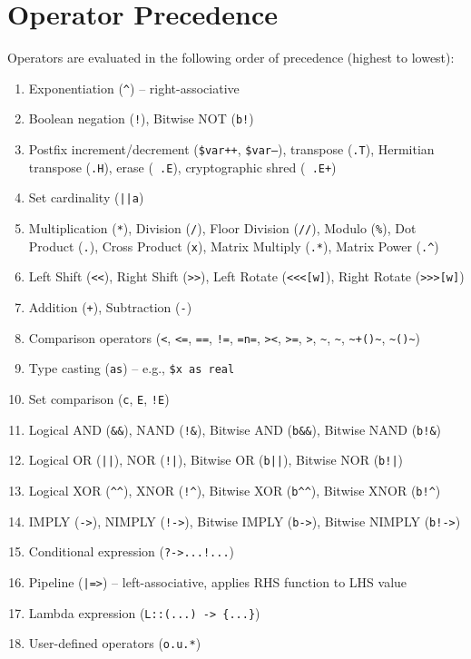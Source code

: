 \section{Operator Precedence}
Operators are evaluated in the following order of precedence (highest to lowest):
\begin{enumerate}
\item Exponentiation (\texttt{\^{}}) -- right-associative
\item Boolean negation (\texttt{!}), Bitwise NOT (\texttt{b!})
\item Postfix increment/decrement (\texttt{\$var++}, \texttt{\$var--}), transpose (\texttt{.T}), Hermitian transpose (\texttt{.H}), erase (\texttt{~.E}), cryptographic shred (\texttt{~.E+})
\item Set cardinality (\texttt{||a})
\item Multiplication (\texttt{*}), Division (\texttt{/}), Floor Division (\texttt{//}), Modulo (\texttt{\%}), Dot Product (\texttt{.}), Cross Product (\texttt{x}), Matrix Multiply (\texttt{.*}), Matrix Power (\texttt{.\^{}})
\item Left Shift (\texttt{<<}), Right Shift (\texttt{>>}), Left Rotate (\texttt{<<<[w]}), Right Rotate (\texttt{>>>[w]})
\item Addition (\texttt{+}), Subtraction (\texttt{-})
\item Comparison operators (\texttt{<}, \texttt{<=}, \texttt{==}, \texttt{!=}, \texttt{=n=}, \texttt{><}, \texttt{>=}, \texttt{>}, \texttt{\textasciitilde}, \texttt{\textasciitilde*}, \texttt{\textasciitilde+()\textasciitilde}, \texttt{\textasciitilde*()\textasciitilde})
\item Type casting (\texttt{as}) -- e.g., \texttt{\$x as real}
\item Set comparison (\texttt{c}, \texttt{E}, \texttt{!E})
\item Logical AND (\texttt{\&\&}), NAND (\texttt{!\&}), Bitwise AND (\texttt{b\&\&}), Bitwise NAND (\texttt{b!\&})
\item Logical OR (\texttt{||}), NOR (\texttt{!|}), Bitwise OR (\texttt{b||}), Bitwise NOR (\texttt{b!|})
\item Logical XOR (\texttt{\^{}}\texttt{\^{}}), XNOR (\texttt{!}\texttt{\^{}}), Bitwise XOR (\texttt{b\^{}}\texttt{\^{}}), Bitwise XNOR (\texttt{b!}\texttt{\^{}})
\item IMPLY (\texttt{->}), NIMPLY (\texttt{!->}), Bitwise IMPLY (\texttt{b->}), Bitwise NIMPLY (\texttt{b!->})
\item Conditional expression (\texttt{?->...!...})
\item Pipeline (\texttt{|=>}) -- left-associative, applies RHS function to LHS value
\item Lambda expression (\texttt{L::(...) -> \{...\}})
\item User-defined operators (\texttt{o.u.*})
\end{enumerate}

